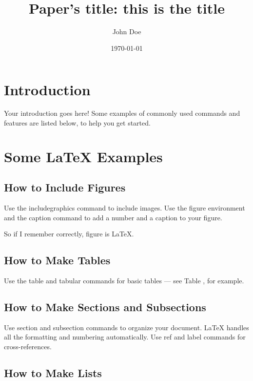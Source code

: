 \documentclass[a4paper]{article}
\title{Paper's title: this is the title}
\author{John Doe}
\date{\today}
\begin{document}
\maketitle


\section{Introduction}

Your introduction goes here! Some examples of commonly used commands and features are listed below, to help you get started.

\section{Some \LaTeX{} Examples}
\label{sec:examples}

\subsection{How to Include Figures}

Use the includegraphics command to include images. Use the figure environment and the caption command to add a number and a caption to your figure.

So if I remember correctly, figure  is \LaTeX{}.

\subsection{How to Make Tables}

Use the table and tabular commands for basic tables --- see Table , for example.


\subsection{How to Make Sections and Subsections}

Use section and subsection commands to organize your document. \LaTeX{} handles all the formatting and numbering automatically. Use ref and label commands for cross-references.

\subsection{How to Make Lists}
\end{document}
